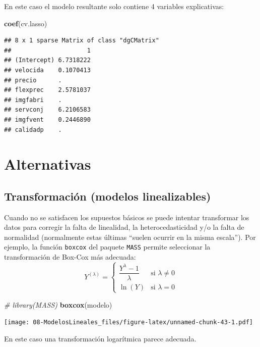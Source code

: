 \documentclass[]{book}
\newenvironment{Shaded}{\begin{snugshade}}{\end{snugshade}}
\newcommand{\CommentTok}[1]{\textcolor[rgb]{0.56,0.35,0.01}{\textit{#1}}}
\newcommand{\KeywordTok}[1]{\textcolor[rgb]{0.13,0.29,0.53}{\textbf{#1}}}
\newcommand{\NormalTok}[1]{#1}
\begin{document}
En este caso el modelo resultante solo contiene 4 variables explicativas:

\begin{Shaded}
\begin{Highlighting}[]
\KeywordTok{coef}\NormalTok{(cv.lasso)}
\end{Highlighting}
\end{Shaded}

\begin{verbatim}
## 8 x 1 sparse Matrix of class "dgCMatrix"
##                     1
## (Intercept) 6.7318222
## velocida    0.1070413
## precio      .        
## flexprec    2.5781037
## imgfabri    .        
## servconj    6.2106583
## imgfvent    0.2446890
## calidadp    .
\end{verbatim}

\hypertarget{alternativas}{%
\section{Alternativas}\label{alternativas}}

\hypertarget{transformacion-modelos-linealizables}{%
\subsection{Transformación (modelos linealizables)}\label{transformacion-modelos-linealizables}}

Cuando no se satisfacen los supuestos básicos se puede intentar
transformar los datos para corregir la falta de
linealidad, la heterocedasticidad y/o la falta de normalidad
(normalmente estas últimas ``suelen ocurrir en la misma escala'').
Por ejemplo, la función \texttt{boxcox} del paquete \texttt{MASS} permite seleccionar la transformación de Box-Cox
más adecuada:
\[Y^{(\lambda)} =
\begin{cases}
\dfrac{Y^\lambda - 1}{\lambda} & \text{si } \lambda \neq 0 \\
\ln{(Y)} & \text{si } \lambda = 0
\end{cases}\]

\begin{Shaded}
\begin{Highlighting}[]
\CommentTok{# library(MASS)}
\KeywordTok{boxcox}\NormalTok{(modelo)}
\end{Highlighting}
\end{Shaded}

\texttt{[image: 08-ModelosLineales\_files/figure-latex/unnamed-chunk-43-1.pdf]}

En este caso una transformación logarítmica parece adecuada.
\end{document}
